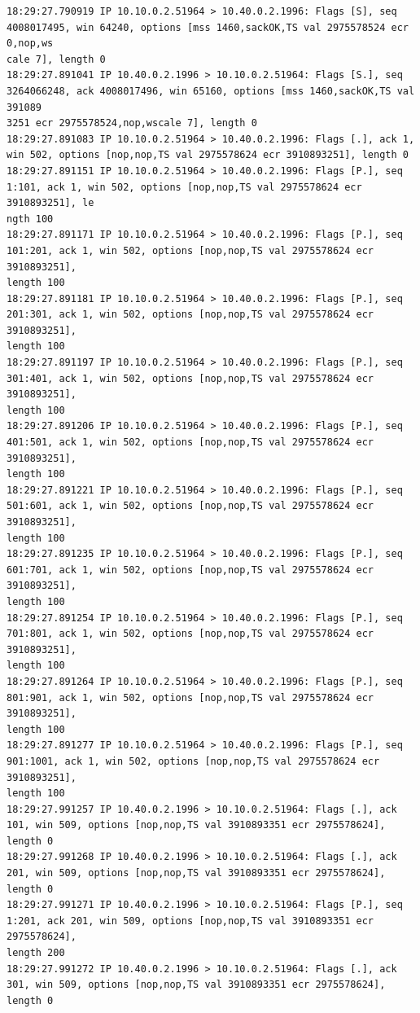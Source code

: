 \documentclass[a4paper,12pt]{article}
\begin{document}
\begin{Verbatim}
18:29:27.790919 IP 10.10.0.2.51964 > 10.40.0.2.1996: Flags [S], seq 4008017495, win 64240, options [mss 1460,sackOK,TS val 2975578524 ecr 0,nop,ws
cale 7], length 0
18:29:27.891041 IP 10.40.0.2.1996 > 10.10.0.2.51964: Flags [S.], seq 3264066248, ack 4008017496, win 65160, options [mss 1460,sackOK,TS val 391089
3251 ecr 2975578524,nop,wscale 7], length 0
18:29:27.891083 IP 10.10.0.2.51964 > 10.40.0.2.1996: Flags [.], ack 1, win 502, options [nop,nop,TS val 2975578624 ecr 3910893251], length 0
18:29:27.891151 IP 10.10.0.2.51964 > 10.40.0.2.1996: Flags [P.], seq 1:101, ack 1, win 502, options [nop,nop,TS val 2975578624 ecr 3910893251], le
ngth 100
18:29:27.891171 IP 10.10.0.2.51964 > 10.40.0.2.1996: Flags [P.], seq 101:201, ack 1, win 502, options [nop,nop,TS val 2975578624 ecr 3910893251],
length 100
18:29:27.891181 IP 10.10.0.2.51964 > 10.40.0.2.1996: Flags [P.], seq 201:301, ack 1, win 502, options [nop,nop,TS val 2975578624 ecr 3910893251],
length 100
18:29:27.891197 IP 10.10.0.2.51964 > 10.40.0.2.1996: Flags [P.], seq 301:401, ack 1, win 502, options [nop,nop,TS val 2975578624 ecr 3910893251],
length 100
18:29:27.891206 IP 10.10.0.2.51964 > 10.40.0.2.1996: Flags [P.], seq 401:501, ack 1, win 502, options [nop,nop,TS val 2975578624 ecr 3910893251],
length 100
18:29:27.891221 IP 10.10.0.2.51964 > 10.40.0.2.1996: Flags [P.], seq 501:601, ack 1, win 502, options [nop,nop,TS val 2975578624 ecr 3910893251],
length 100
18:29:27.891235 IP 10.10.0.2.51964 > 10.40.0.2.1996: Flags [P.], seq 601:701, ack 1, win 502, options [nop,nop,TS val 2975578624 ecr 3910893251],
length 100
18:29:27.891254 IP 10.10.0.2.51964 > 10.40.0.2.1996: Flags [P.], seq 701:801, ack 1, win 502, options [nop,nop,TS val 2975578624 ecr 3910893251],
length 100
18:29:27.891264 IP 10.10.0.2.51964 > 10.40.0.2.1996: Flags [P.], seq 801:901, ack 1, win 502, options [nop,nop,TS val 2975578624 ecr 3910893251],
length 100
18:29:27.891277 IP 10.10.0.2.51964 > 10.40.0.2.1996: Flags [P.], seq 901:1001, ack 1, win 502, options [nop,nop,TS val 2975578624 ecr 3910893251],
length 100
18:29:27.991257 IP 10.40.0.2.1996 > 10.10.0.2.51964: Flags [.], ack 101, win 509, options [nop,nop,TS val 3910893351 ecr 2975578624], length 0
18:29:27.991268 IP 10.40.0.2.1996 > 10.10.0.2.51964: Flags [.], ack 201, win 509, options [nop,nop,TS val 3910893351 ecr 2975578624], length 0
18:29:27.991271 IP 10.40.0.2.1996 > 10.10.0.2.51964: Flags [P.], seq 1:201, ack 201, win 509, options [nop,nop,TS val 3910893351 ecr 2975578624],
length 200
18:29:27.991272 IP 10.40.0.2.1996 > 10.10.0.2.51964: Flags [.], ack 301, win 509, options [nop,nop,TS val 3910893351 ecr 2975578624], length 0

\end{Verbatim}
\end{document}
